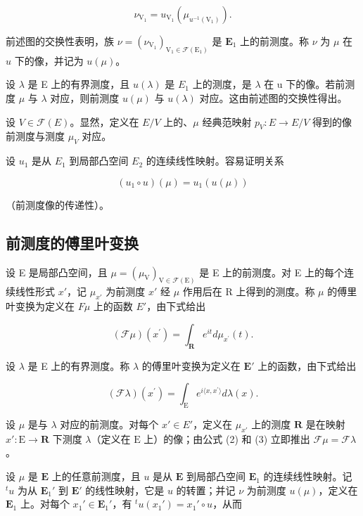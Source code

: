 \[
\nu_ {\mathrm{V} _ {1}} = u _ {\mathrm{V} _ {1}} \left(\mu_ {u ^ {- 1} \left(\mathrm{V} _ {1}\right)}\right).\tag{1}
\]

前述图的交换性表明，族 \(\nu = (\nu_{\mathrm{V}_1})_{\mathrm{V}_1 \in \mathcal{F}(\mathrm{E}_1)}\) 是 \(\mathbf{E}_1\) 上的前测度。称 \(\nu\) 为 \(\mu\) 在 \(u\) 下的像，并记为 \(u(\mu)\)。

设 \(\lambda\) 是 E 上的有界测度，且 \(u(\lambda)\) 是 \(E_{1}\) 上的测度，是 \(\lambda\) 在 u 下的像。若前测度 \(\mu\) 与 \(\lambda\) 对应，则前测度 \(u(\mu)\) 与 \(u(\lambda)\) 对应。这由前述图的交换性得出。

设 \(V \in \mathcal{F}(E)\)。显然，定义在 \(E/V\) 上的、\(\mu\) 经典范映射 \(p_V: E \to E/V\) 得到的像前测度与测度 \(\mu_V\) 对应。

设 \(u_{1}\) 是从 \(E_{1}\) 到局部凸空间 \(E_{2}\) 的连续线性映射。容易证明关系

\[
(u _ {1} \circ u) (\mu) = u _ {1} (u (\mu))
\]

（前测度像的传递性）。

\subsection{前测度的傅里叶变换}

设 E 是局部凸空间，且 \(\mu = (\mu_{\mathrm{V}})_{\mathrm{V} \in \mathcal{F}(\mathrm{E})}\) 是 E 上的前测度。对 E 上的每个连续线性形式 \(x'\)，记 \(\mu_{x'}\) 为前测度 \(x'\) 经 \(\mu\) 作用后在 R 上得到的测度。称 \(\mu\) 的傅里叶变换为定义在 \(F\mu\) 上的函数 \(E'\)，由下式给出

\[
(\mathcal {F} \mu) (x ^ {\prime}) = \int_ {\mathbf {R}} e ^ {i t} d \mu_ {x ^ {\prime}} (t).\tag{2}
\]

设 \(\lambda\) 是 E 上的有界测度。称 \(\lambda\) 的傅里叶变换为定义在 \(\mathbf{E}'\) 上的函数，由下式给出

\[
(\mathcal {F} \lambda) (x ^ {\prime}) = \int_ {\mathrm{E}} e ^ {i \langle x, x ^ {\prime} \rangle} d \lambda (x).\tag{3}
\]

设 \(\mu\) 是与 \(\lambda\) 对应的前测度。对每个 \(x' \in E'\)，定义在 \(\mu_{x'}\) 上的测度 \(\mathbf{R}\) 是在映射 \(x': \mathrm{E} \to \mathbf{R}\) 下测度 \(\lambda\)（定义在 \(\mathrm{E}\) 上）的像；由公式 (2) 和 (3) 立即推出 \(\mathcal{F}\mu = \mathcal{F}\lambda\)。

设 \(\mu\) 是 \(\mathbf{E}\) 上的任意前测度，且 \(u\) 是从 \(\mathbf{E}\) 到局部凸空间 \(\mathbf{E}_1\) 的连续线性映射。记 \(^t u\) 为从 \(\mathbf{E}_1'\) 到 \(\mathbf{E}'\) 的线性映射，它是 \(u\) 的转置；并记 \(\nu\) 为前测度 \(u(\mu)\)，定义在 \(\mathbf{E}_1\) 上。对每个 \(x_1' \in \mathbf{E}_1'\)，有 \(^t u(x_1') = x_1' \circ u\)，从而

